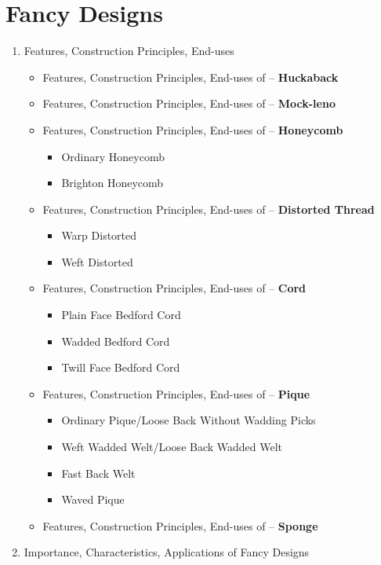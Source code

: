 \section{Fancy Designs}

\begin{enumerate}[label=\textbf{\Alph*.}]
    \item Features, Construction Principles, End-uses

\begin{itemize}
    \item Features, Construction Principles, End-uses of -- \textbf{Huckaback}
    \item Features, Construction Principles, End-uses of -- \textbf{Mock-leno}
    \item Features, Construction Principles, End-uses of -- \textbf{Honeycomb}
    \begin{itemize}
        \item Ordinary Honeycomb
        \item Brighton Honeycomb
    \end{itemize}
    \item Features, Construction Principles, End-uses of -- \textbf{Distorted Thread}
    \begin{itemize}
        \item Warp Distorted
        \item Weft Distorted
    \end{itemize}
    \item Features, Construction Principles, End-uses of -- \textbf{Cord}
    \begin{itemize}
        \item Plain Face Bedford Cord
        \item Wadded Bedford Cord
        \item Twill Face Bedford Cord
    \end{itemize}
    \item Features, Construction Principles, End-uses of -- \textbf{Pique}
    \begin{itemize}
        \item Ordinary Pique/Loose Back Without Wadding Picks
        \item Weft Wadded Welt/Loose Back Wadded Welt
        \item Fast Back Welt
        \item Waved Pique
    \end{itemize}
    \item Features, Construction Principles, End-uses of -- \textbf{Sponge}
\end{itemize}
    \item Importance, Characteristics, Applications of Fancy Designs
\end{enumerate}
